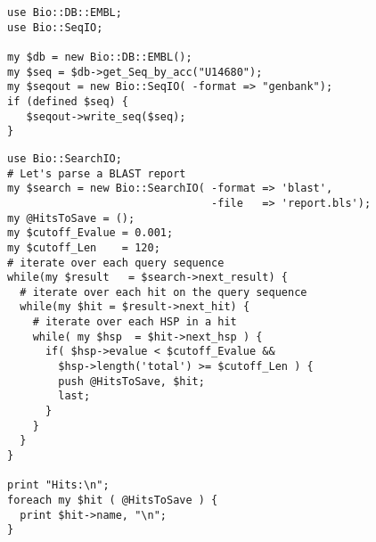 \documentclass[12pt]{article}
\begin{document}
\newpage

\singlespacing

%
%

\newpage

\begin{verbatim}
use Bio::DB::EMBL;
use Bio::SeqIO;

my $db = new Bio::DB::EMBL();
my $seq = $db->get_Seq_by_acc("U14680");
my $seqout = new Bio::SeqIO( -format => "genbank");
if (defined $seq) { 
   $seqout->write_seq($seq);
}
\end{verbatim}

\newpage

\begin{verbatim}
use Bio::SearchIO;
# Let's parse a BLAST report 
my $search = new Bio::SearchIO( -format => 'blast',
                                -file   => 'report.bls');
my @HitsToSave = ();
my $cutoff_Evalue = 0.001; 
my $cutoff_Len    = 120;   
# iterate over each query sequence
while(my $result   = $search->next_result) {
  # iterate over each hit on the query sequence
  while(my $hit = $result->next_hit) {
    # iterate over each HSP in a hit
    while( my $hsp  = $hit->next_hsp ) {
      if( $hsp->evalue < $cutoff_Evalue && 
        $hsp->length('total') >= $cutoff_Len ) { 
        push @HitsToSave, $hit;
        last;
      } 
    }
  }
}

print "Hits:\n";
foreach my $hit ( @HitsToSave ) {
  print $hit->name, "\n";	
}

\end{verbatim}
\end{document}
